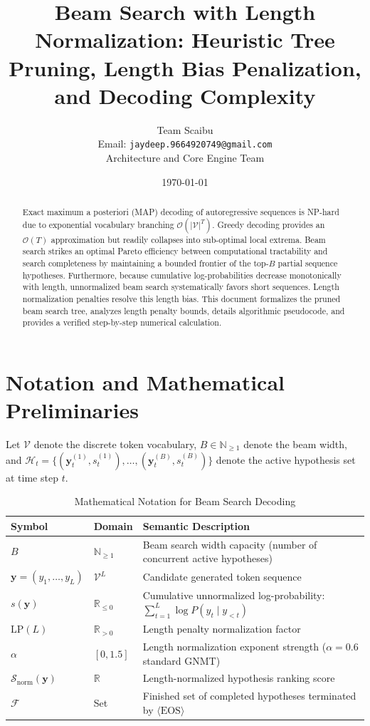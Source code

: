 \documentclass[11pt,a4paper]{article}
\title{Beam Search with Length Normalization: Heuristic Tree Pruning, Length Bias Penalization, and Decoding Complexity}
\author{Team Scaibu \\ \small Email: \texttt{jaydeep.9664920749@gmail.com} \\ \small Architecture and Core Engine Team}
\date{\today}
\theoremstyle{definition}
\begin{document}
\maketitle

\begin{abstract}
Exact maximum a posteriori (MAP) decoding of autoregressive sequences is NP-hard due to exponential vocabulary branching $\mathcal{O}(|\mathcal{V}|^T)$. Greedy decoding provides an $\mathcal{O}(T)$ approximation but readily collapses into sub-optimal local extrema. Beam search strikes an optimal Pareto efficiency between computational tractability and search completeness by maintaining a bounded frontier of the top-$B$ partial sequence hypotheses. Furthermore, because cumulative log-probabilities decrease monotonically with length, unnormalized beam search systematically favors short sequences. Length normalization penalties resolve this length bias. This document formalizes the pruned beam search tree, analyzes length penalty bounds, details algorithmic pseudocode, and provides a verified step-by-step numerical calculation.
\end{abstract}

\section{Notation and Mathematical Preliminaries}

Let $\mathcal{V}$ denote the discrete token vocabulary, $B \in \mathbb{N}_{\ge 1}$ denote the beam width, and $\mathcal{H}_t = \{(\mathbf{y}_t^{(1)}, s_t^{(1)}), \dots, (\mathbf{y}_t^{(B)}, s_t^{(B)})\}$ denote the active hypothesis set at time step $t$.

\begin{table}[h]
\centering
\caption{Mathematical Notation for Beam Search Decoding}
\begin{tabular}{lll}
\toprule
\textbf{Symbol} & \textbf{Domain} & \textbf{Semantic Description} \\
\midrule
$B$ & $\mathbb{N}_{\ge 1}$ & Beam search width capacity (number of concurrent active hypotheses) \\
$\mathbf{y} = (y_1, \dots, y_L)$ & $\mathcal{V}^L$ & Candidate generated token sequence \\
$s(\mathbf{y})$ & $\mathbb{R}_{\le 0}$ & Cumulative unnormalized log-probability: $\sum_{t=1}^L \log P(y_t \mid y_{<t})$ \\
$\text{LP}(L)$ & $\mathbb{R}_{> 0}$ & Length penalty normalization factor \\
$\alpha$ & $[0, 1.5]$ & Length normalization exponent strength ($\alpha = 0.6$ standard GNMT) \\
$\mathcal{S}_{\text{norm}}(\mathbf{y})$ & $\mathbb{R}$ & Length-normalized hypothesis ranking score \\
$\mathcal{F}$ & Set & Finished set of completed hypotheses terminated by $\langle \text{EOS} \rangle$ \\
\bottomrule
\end{tabular}
\end{table}
\end{document}
